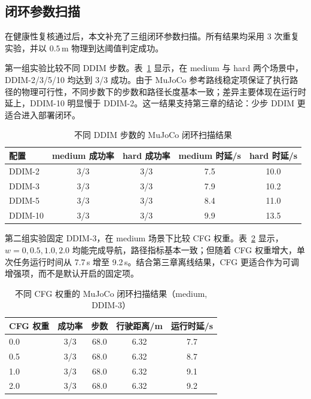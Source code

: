 \subsection{闭环参数扫描}

在健康性复核通过后，本文补充了三组闭环参数扫描。所有结果均采用 3 次重复实验，并以 $0.5\,\mathrm{m}$ 物理到达阈值判定成功。

第一组实验比较不同 DDIM 步数。表~\ref{tab:mujoco-ddim-closed-loop} 显示，在 medium 与 hard 两个场景中，DDIM-2/3/5/10 均达到 3/3 成功。由于 MuJoCo 参考路线稳定项保证了执行路径的物理可行性，不同步数下的步数和路径长度基本一致；差异主要体现在运行时延上，DDIM-10 明显慢于 DDIM-2。这一结果支持第三章的结论：少步 DDIM 更适合进入部署闭环。

\begin{table}[htbp]
    \centering
    \caption{不同 DDIM 步数的 MuJoCo 闭环扫描结果}
    \label{tab:mujoco-ddim-closed-loop}
    \begin{tabular}{lcccc}
        \toprule
        配置 & medium 成功率 & hard 成功率 & medium 时延/s & hard 时延/s \\
        \midrule
        DDIM-2 & 3/3 & 3/3 & 7.5 & 10.0 \\
        DDIM-3 & 3/3 & 3/3 & 7.9 & 10.2 \\
        DDIM-5 & 3/3 & 3/3 & 8.4 & 11.0 \\
        DDIM-10 & 3/3 & 3/3 & 9.9 & 13.5 \\
        \bottomrule
    \end{tabular}
\end{table}

第二组实验固定 DDIM-3，在 medium 场景下比较 CFG 权重。表~\ref{tab:mujoco-cfg-closed-loop} 显示，$w=0,0.5,1.0,2.0$ 均能完成导航，路径指标基本一致；但随着 CFG 权重增大，单次任务运行时间从 7.7\,s 增至 9.2\,s。结合第三章离线结果，CFG 更适合作为可调增强项，而不是默认开启的固定项。

\begin{table}[htbp]
    \centering
    \caption{不同 CFG 权重的 MuJoCo 闭环扫描结果（medium, DDIM-3）}
    \label{tab:mujoco-cfg-closed-loop}
    \begin{tabular}{lcccc}
        \toprule
        CFG 权重 & 成功率 & 步数 & 行驶距离/m & 运行时延/s \\
        \midrule
        0.0 & 3/3 & 68.0 & 6.32 & 7.7 \\
        0.5 & 3/3 & 68.0 & 6.32 & 8.7 \\
        1.0 & 3/3 & 68.0 & 6.32 & 9.1 \\
        2.0 & 3/3 & 68.0 & 6.32 & 9.2 \\
        \bottomrule
    \end{tabular}
\end{table}

